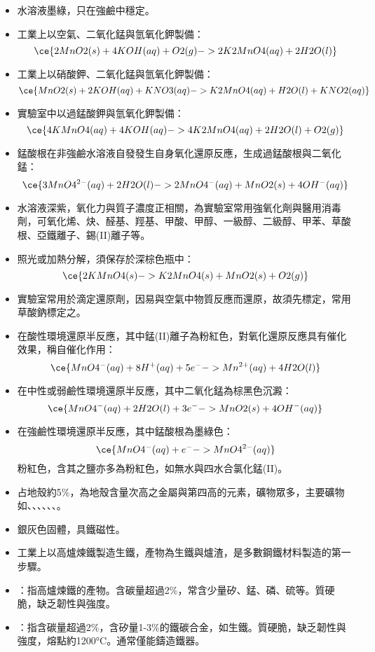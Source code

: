 \documentclass[a4paper,12pt]{report}
\begin{document}
\begin{itemize}
\bit
\item 水溶液墨綠，只在強鹼中穩定。
\item 工業上以空氣、二氧化錳與氫氧化鉀製備：
\[\ce{2MnO2(s) + 4KOH(aq) + O2(g) -> 2K2MnO4(aq) + 2H2O(l)}\]
\item 工業上以硝酸鉀、二氧化錳與氫氧化鉀製備：
\[\ce{MnO2(s) + 2KOH(aq) + KNO3(aq) -> K2MnO4(aq) + H2O(l) + KNO2(aq)}\]
\item 實驗室中以過錳酸鉀與氫氧化鉀製備：
\[\ce{4KMnO4(aq) + 4KOH(aq) -> 4K2MnO4(aq) + 2H2O(l) + O2(g)}\]
\item 錳酸根在非強鹼水溶液自發發生自身氧化還原反應，生成過錳酸根與二氧化錳：
\[\ce{3MnO4^{2-}(aq) + 2H2O(l) -> 2MnO4^-(aq) + MnO2(s) + 4OH^-(aq)}\]
\eit
{}
\bit
\item 水溶液深紫，氧化力與質子濃度正相關，為實驗室常用強氧化劑與醫用消毒劑，可氧化烯、炔、醛基、羥基、甲酸、甲醇、一級醇、二級醇、甲苯、草酸根、亞鐵離子、錫(II)離子等。
\item 照光或加熱分解，須保存於深棕色瓶中：
\[\ce{2KMnO4(s) -> K2MnO4(s) + MnO2(s) + O2(g)}\]
\item 實驗室常用於滴定還原劑，因易與空氣中物質反應而還原，故須先標定，常用草酸鈉標定之。
\item 在酸性環境還原半反應，其中錳(II)離子為粉紅色，對氧化還原反應具有催化效果，稱自催化作用：
\[\ce{MnO4^-(aq) + 8H^+(aq) + 5e^- -> Mn^{2+}(aq) + 4H2O(l)}\]
\item 在中性或弱鹼性環境還原半反應，其中二氧化錳為棕黑色沉澱：
\[\ce{MnO4^-(aq) + 2H2O(l) + 3e^- -> MnO2(s) + 4OH^-(aq)}\]
\item 在強鹼性環境還原半反應，其中錳酸根為墨綠色：
\[\ce{MnO4^-(aq) + e^- -> MnO4^{2-}(aq)}\]
\eit
{}
粉紅色，含其之鹽亦多為粉紅色，如無水與四水合氯化錳(II)。
\bit
\item 占地殼約5\%，為地殼含量次高之金屬與第四高的元素，礦物眾多，主要礦物如、、、、、、。
\item 銀灰色固體，具鐵磁性。
\item 工業上以高爐煉鐵製造生鐵，產物為生鐵與爐渣，是多數鋼鐵材料製造的第一步驟。
\item {}：指高爐煉鐵的產物。含碳量超過2\%，常含少量矽、錳、磷、硫等。質硬脆，缺乏韌性與強度。
\item {}：指含碳量超過2\%，含矽量1-3\%的鐵碳合金，如生鐵。質硬脆，缺乏韌性與強度，熔點約1200°C。通常僅能鑄造鐵器。

\end{itemize}
\end{document}
